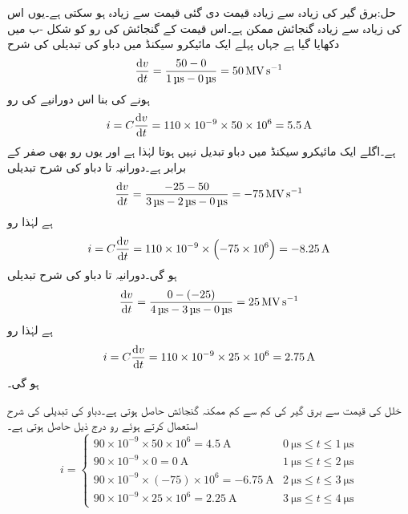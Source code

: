 حل:برق گیر کی زیادہ سے زیادہ قیمت دی گئی قیمت سے  زیادہ ہو سکتی ہے۔یوں اس کی زیادہ سے زیادہ گنجائش  ممکن ہے۔اس قیمت کے گنجائش کی رو کو شکل -ب میں دکھایا گیا ہے جہاں پہلے ایک مائیکرو سیکنڈ میں دباو کی تبدیلی کی شرح 
\begin{align*}
\frac{\dif v}{\dif t}=\frac{50-0}{\SI{1}{\micro\second}-\SI{0}{\micro\second}}=\SI{50}{\mega \volt \per\second}
\end{align*} 
ہونے کی بنا اس دورانیے کی رو
\begin{align*}
i=C \frac{\dif v}{\dif t}=110 \times 10^{-9} \times 50 \times 10^{6}=\SI{5.5}{\ampere}
\end{align*}
ہے۔اگلے ایک مائیکرو سیکنڈ میں دباو تبدیل نہیں ہوتا لہٰذا  ہے اور یوں رو بھی صفر کے برابر ہے۔دورانیہ  تا   دباو کی شرح تبدیلی
\begin{align*}
\frac{\dif v}{\dif t}=\frac{-25-50}{\SI{3}{\micro\second}-\SI{2}{\micro\second}-\SI{0}{\micro\second}}=\SI{-75}{\mega \volt \per\second}
\end{align*}
ہے لہٰذا رو
\begin{align*}
i=C \frac{\dif v}{\dif t}=110 \times 10^{-9} \times \left(-75 \times 10^{6}\right)=\SI{-8.25}{\ampere}
\end{align*}
ہو گی۔دورانیہ  تا   دباو کی شرح تبدیلی
\begin{align*}
\frac{\dif v}{\dif t}=\frac{0-(-25)}{\SI{4}{\micro\second}-\SI{3}{\micro\second}-\SI{0}{\micro\second}}=\SI{25}{\mega \volt \per\second}
\end{align*}
ہے لہٰذا رو
\begin{align*}
i=C \frac{\dif v}{\dif t}=110 \times 10^{-9} \times 25\times 10^{6}=\SI{2.75}{\ampere}
\end{align*}
ہو گی۔

خلل کی قیمت سے برق گیر کی کم سے کم ممکنہ گنجائش  حاصل ہوتی ہے۔دباو کی تبدیلی کی شرح استعمال کرتے ہوئے رو درج ذیل حاصل ہوتی ہے۔
\begin{equation*}
i=
\begin{cases}
90 \times 10^{-9} \times 50 \times 10^{6}=\SI{4.5}{\ampere} & \SI{0}{\micro\second} \le t \le \SI{1}{\micro\second}\\
90 \times 10^{-9} \times 0=\SI{0}{\ampere} & \SI{1}{\micro\second} \le t \le \SI{2}{\micro\second}\\
90 \times 10^{-9} \times (-75) \times 10^{6}=\SI{-6.75}{\ampere} & \SI{2}{\micro\second}  \le t \le \SI{3}{\micro\second}\\
90 \times 10^{-9} \times 25 \times 10^{6}=\SI{2.25}{\ampere} & \SI{3}{\micro\second}  \le t \le \SI{4}{\micro\second}
\end{cases}
\end{equation*}


